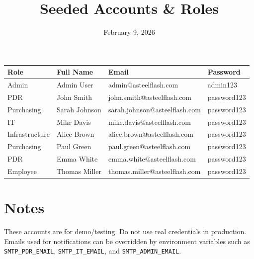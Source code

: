 \documentclass{article}
\title{Seeded Accounts \& Roles}
\date{February 9, 2026}
\begin{document}
\maketitle
\begin{longtable}{| l | l | l | l |}
\hline
Role & Full Name & Email & Password \\
\hline
Admin & Admin User & admin@asteelflash.com & admin123 \\
PDR & John Smith & john.smith@asteelflash.com & password123 \\
Purchasing & Sarah Johnson & sarah.johnson@asteelflash.com & password123 \\
IT & Mike Davis & mike.davis@asteelflash.com & password123 \\
Infrastructure & Alice Brown & alice.brown@asteelflash.com & password123 \\
Purchasing & Paul Green & paul.green@asteelflash.com & password123 \\
PDR & Emma White & emma.white@asteelflash.com & password123 \\
Employee & Thomas Miller & thomas.miller@asteelflash.com & password123 \\
\hline
\end{longtable}

\section*{Notes}
These accounts are for demo/testing. Do not use real credentials in production. Emails used for notifications can be overridden by environment variables such as \texttt{SMTP\_PDR\_EMAIL}, \texttt{SMTP\_IT\_EMAIL}, and \texttt{SMTP\_ADMIN\_EMAIL}.
\end{document}
